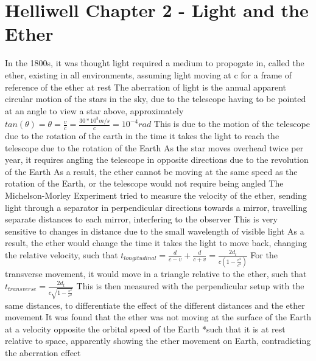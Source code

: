 \documentclass[11 pt, twoside]{article}
\newenvironment{outline*}
{
	\begin{outline}[enumerate]
	}
	{\end{outline}
}
\begin{document}
\section{Helliwell Chapter 2 - Light and the Ether}
\begin{outline*}
\1 In the 1800s, it was thought light required a medium to propogate in, called the ether, existing in all environments, assuming light moving at c for a frame of reference of the ether at rest
\1 The aberration of light is the annual apparent circular motion of the stars in the sky, due to the telescope having to be pointed at an angle to view a star above, approximately $tan(\theta) = \theta = \frac{v}{c} = \frac{30 * 10^3 m/s}{c} = 10^{-4} rad$
\2 This is due to the motion of the telescope due to the rotation of the earth in the time it takes the light to reach the telescope due to the rotation of the Earth
\2 As the star moves overhead twice per year, it requires angling the telescope in opposite directions due to the revolution of the Earth
\2 As a result, the ether cannot be moving at the same speed as the rotation of the Earth, or the telescope would not require being angled
\1 The Michelson-Morley Experiment tried to measure the velocity of the ether, sending light through a separator in perpendicular directions towards a mirror, travelling separate distances to each mirror, interfering to the observer
\2 This is very sensitive to changes in distance due to the small wavelength of visible light
\2 As a result, the ether would change the time it takes the light to move back, changing the relative velocity, such that $t_{longitudinal} = \frac{d}{c - v} + \frac{d}{c + v} = \frac{2d_l}{c(1 - \frac{v^2}{c^2})}$
\3 For the transverse movement, it would move in a triangle relative to the ether, such that $t_{transverse} = \frac{2d_t}{c\sqrt{1 - \frac{v^2}{c^2}}}$
\2 This is then measured with the perpendicular setup with the same distances, to differentiate the effect of the different distances and the ether movement
\1 It was found that the ether was not moving at the surface of the Earth at a velocity opposite the orbital speed of the Earth *such that it is at rest relative to space, apparently showing the ether movement on Earth, contradicting the aberration effect
\end{outline*}
\end{document}
